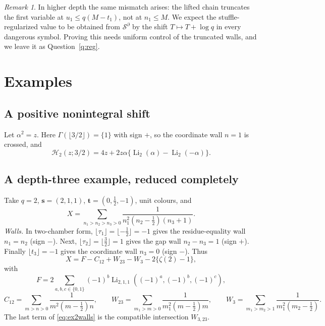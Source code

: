 \documentclass[11pt]{amsart}
\theoremstyle{definition}
\theoremstyle{remark}
\newtheorem{remark}[theorem]{Remark}
\numberwithin{equation}{section}
\newcommand{\Li}{\operatorname{Li}}
\newcommand{\cS}{\mathcal{S}}
\newcommand{\s}{\mathbf{s}}
\newcommand{\tb}{\mathbf{t}}
\newcommand{\Hs}{\mathcal{H}}
\newcommand{\lfl}{\lfloor}
\newcommand{\rfl}{\rfloor}
\begin{document}
\begin{remark}
In higher depth the same mismatch arises: the lifted chain truncates the first variable at $u_1\le q(M-t_1)$, not at $n_1\le M$. We expect the stuffle-regularized value to be obtained from $\cS^\partial$ by the shift $T\mapsto T+\log q$ in every dangerous symbol. Proving this needs uniform control of the truncated walls, and we leave it as Question~\ref{q:reg}.
\end{remark}

\section{Examples}\label{sec:examples}

\subsection{A positive nonintegral shift}
Let $\alpha^2=z$. Here $\Gamma(\lfl3/2\rfl)=\{1\}$ with sign $+$, so the coordinate wall $n=1$ is crossed, and
\begin{equation}\label{eq:ex1}
\Hs_2(z;3/2)=4z+2z\alpha\{\Li_2(\alpha)-\Li_2(-\alpha)\}.
\end{equation}

\subsection{A depth-three example, reduced completely}\label{ex:depth3}
Take $q=2$, $\s=(2,1,1)$, $\tb=(0,\tfrac12,-1)$, unit colours, and
\[
X=\sum_{n_1>n_2>n_3>0}\frac{1}{n_1^2(n_2-\frac12)(n_3+1)} .
\]
\emph{Walls.} In two-chamber form, $\lfl\tau_1\rfl=\lfl-\tfrac12\rfl=-1$ gives the residue-equality wall $n_1=n_2$ (sign $-$). Next, $\lfl\tau_2\rfl=\lfl\tfrac32\rfl=1$ gives the gap wall $n_2-n_3=1$ (sign $+$). Finally $\lfl t_3\rfl=-1$ gives the coordinate wall $n_3=0$ (sign $-$). Thus
\begin{equation}\label{eq:ex2walls}
X=F-C_{12}+W_{23}-W_3-2\{\zeta(2)-1\},
\end{equation}
with
\[
F=2\sum_{a,b,c\in\{0,1\}}(-1)^b\Li_{2,1,1}((-1)^a,(-1)^b,(-1)^c),
\]
\[
C_{12}=\sum_{m>n>0}\frac{1}{m^2(m-\frac12)n},\qquad
W_{23}=\sum_{m_1>m>0}\frac{1}{m_1^2(m-\frac12)m},\qquad
W_3=\sum_{m_1>m_2>1}\frac{1}{m_1^2(m_2-\frac12)} .
\]
The last term of \eqref{eq:ex2walls} is the compatible intersection $W_{3,23}$.
\end{document}
